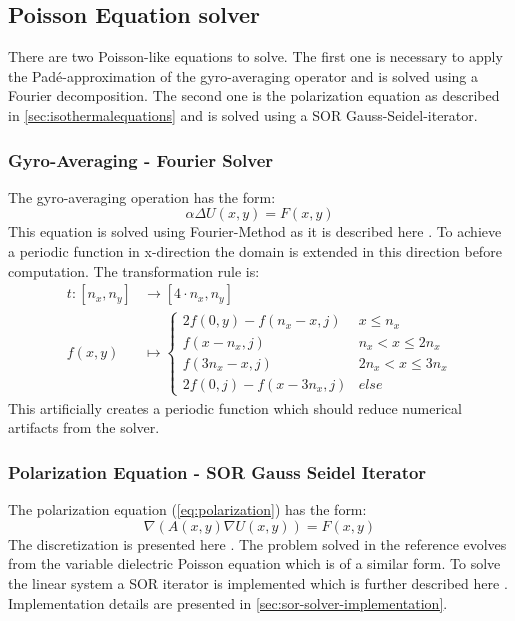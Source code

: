 \documentclass[master.tex]{subfiles}
\begin{document}
\subsection{Poisson Equation solver}
There are two Poisson-like equations to solve. The first one is necessary to apply the Padé-approximation of the gyro-averaging operator and is solved using a Fourier decomposition. The second one is the polarization equation as described in \autoref{sec:isothermalequations} and is solved using a \ac{SOR} Gauss-Seidel-iterator.

\subsubsection{Gyro-Averaging - Fourier Solver}
The gyro-averaging operation has the form:
\begin{equation}
    \alpha \Delta U(x, y) = F(x, y)
\end{equation}
This equation is solved using Fourier-Method as it is described here \cite{fft-poisson}. To achieve a periodic function in x-direction the domain is extended in this direction before computation. The transformation rule is:
\begin{equation}
\label{eq:gyro-transformation}
\begin{split}
    t\colon [n_x, n_y] & \to [4 \cdot n_x, n_y]\\
    f(x, y) &\mapsto \begin{cases}
    2 f(0, y) - f(n_x - x, j) & x \leq n_x\\
    f(x - n_x, j) & n_x < x \leq 2n_x\\
    f(3n_x-x,j) & 2n_x < x \leq 3n_x \\
    2 f(0, j) - f(x - 3n_x, j) & else
    \end{cases}
\end{split}
\end{equation}
This artificially creates a periodic function which should reduce numerical artifacts from the solver.

\subsubsection{Polarization Equation - \ac{SOR} Gauss Seidel Iterator} \label{sec:polarization-equation}
The polarization equation (\autoref{eq:polarization}) has the form:
\begin{equation}
    \nabla\left( A(x, y) \nabla U(x, y)\right) = F(x, y)
\end{equation}
The discretization is presented here \cite{DielectricPoisson}. The problem solved in the reference evolves from the variable dielectric Poisson equation which is of a similar form. To solve the linear system a \ac{SOR} iterator is implemented which is further described here \cite{SORPaper}. Implementation details are presented in \autoref{sec:sor-solver-implementation}.
\end{document}
